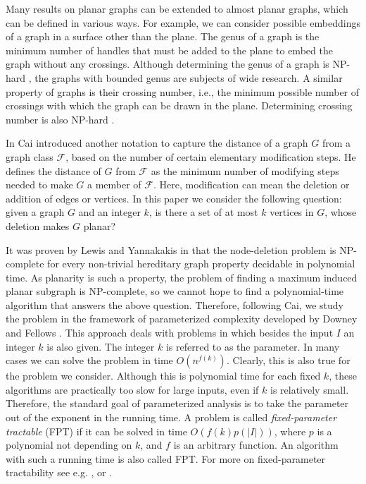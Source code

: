 \documentclass{llncs}
\begin{document}
Many results on planar graphs can be extended to almost planar graphs,
which can be defined in various ways.
For example, we can consider possible embeddings of a graph in a surface other than the plane.
The genus of a graph is the minimum number of handles that must be added to the
plane to embed the graph without any crossings.
Although determining the genus of a graph is NP-hard \cite{tho89},
the graphs with bounded genus are subjects of wide research.
A similar property of graphs is their crossing number, i.e.,
the minimum possible number of crossings with which the graph can be drawn in the plane.
Determining crossing number is also NP-hard \cite{gar83}.

In \cite{cai96} Cai introduced another notation to capture the distance of a
graph $G$ from a graph class $\mathcal{F}$, based on the number of certain elementary modification steps.
He defines the distance of $G$ from $\mathcal{F}$ as the minimum number of modifying steps needed to
make $G$ a member of $\mathcal{F}$.
Here, modification can mean the deletion or addition of edges or vertices.
In this paper we consider the following question: given a graph $G$ and an integer
$k$, is there a set of at most $k$ vertices in $G$, whose deletion makes $G$ planar?

It was proven by Lewis and Yannakakis in \cite{lew80} that the node-deletion problem is NP-complete
for every non-trivial hereditary graph property decidable in polynomial time.
As planarity is such a property, the problem of finding a maximum induced planar subgraph is NP-complete,
so we cannot hope to find a polynomial-time algorithm that answers the above question.
Therefore, following Cai, we study the problem in the framework of parameterized complexity
developed by Downey and Fellows \cite{dow99}.
This approach deals with problems in which besides the input $I$ an integer $k$ is also
given. The integer $k$ is referred to as the parameter.
In many cases we can solve the problem in time $O(n^{f(k)})$.
Clearly, this is also true for the problem we consider.
Although this is polynomial time for each fixed $k$, these algorithms are practically
too slow for large inputs, even if $k$ is relatively small.
Therefore, the standard goal of parameterized analysis is to take the parameter
out of the exponent in the running time.
A problem is called \emph{fixed-parameter tractable} (FPT) if it can be solved in
time $O(f(k)p(|I|))$, where $p$ is a polynomial not depending on $k$, and $f$ is an arbitrary function.
An algorithm with such a running time is also called FPT.
For more on fixed-parameter tractability see e.g.  \cite{dow99}, \cite{nie06} or \cite{flu06}.
\end{document}

